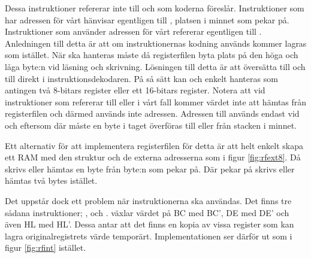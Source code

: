 \documentclass[main.tex]{subfiles}
\begin{document}
Dessa instruktioner refererar inte till  och  som koderna
föreslår. Instruktioner som har adressen för vårt  hänvisar egentligen
till , platsen i minnet som  pekar på. Instruktioner som
använder adressen för vårt  refererar egentligen till .
Anledningen till detta är att om instruktionernas kodning används kommer
 lagras som  istället. När  ska hanteras måste då
registerfilen byta plats på den höga och låga byte:n vid läsning och skrivning.
Lösningen till detta är att översätta  till  och 
till  direkt i instruktionsdekodaren. På så sätt kan  och
 enkelt hanteras som antingen två 8-bitars register eller ett 16-bitars
register. Notera att vid instruktioner som refererar till  eller i
vårt fall  kommer värdet inte att hämtas från registerfilen och därmed
används inte adressen. Adressen till  används endast vid 
och  eftersom där måste en byte i taget överföras till eller från
stacken i minnet.

Ett alternativ för att implementera registerfilen för detta är att helt enkelt
skapa ett RAM med den struktur och de externa adresserna som i figur
\ref{fig:rfext8}. Då skrivs eller hämtas en byte från byte:n som 
pekar på. Där  pekar på skrivs eller hämtas två bytes istället.

Det uppstår dock ett problem när  instruktionerna ska användas. Det
finns tre sådana instruktioner; ,  och
.  växlar värdet på BC med BC', DE med DE' och även HL med
HL'. Dessa antar att det finns en kopia av vissa register som kan lagra
originalregistrets värde temporärt. Implementationen ser därför ut som i figur
\ref{fig:rfint} istället.
\end{document}
